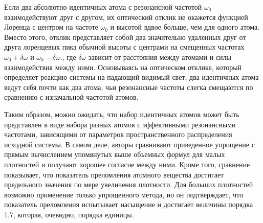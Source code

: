 \documentclass[a4paper, 14pt]{extarticle}
\begin{document}
Если два абсолютно идентичных атома с резонансной частотой $\omega_0$ 
взаимодействуют друг с другом, их оптический отклик не окажется функцией 
Лоренца с центром на частоте $\omega_0$ и высотой вдвое больше, чем для 
одного атома. Вместо этого, отклик представляет собой два значительно 
удаленных друг от друга лоренцевых пика обычной высоты с центрами на 
смещенных частотах $\omega_0 + \delta\omega$ и $\omega_0 
- \delta\omega$., где $\delta\omega$ зависит от расстояния между атомами 
и силы взаимодействия между ними. Основываясь на оптическом отклике, 
который определяет реакцию системы на падающий видимый свет, два 
идентичных атома ведут себя почти как два атома, чьи резонансные частоты 
слегка смещаются по сравнению с изначальной частотой атомов.



Таким образом, можно ожидать, что набор идентичных атомов может быть 
представлен в виде набора разных атомов с эффективными резонансными 
частотами, зависящими от параметров пространственного распределения 
исходной системы. В самом деле, авторы сравнивают приведенное упрощение 
с прямым вычислением упомянутых выше объемных формул для малых 
плотностей и получают хорошее согласие между ними. Кроме того, сравнение 
показывает, что показатель преломления атомного вещества достигает 
предельного значения по мере увеличения плотности. Для больших 
плотностей возможно применение только упрощенного метода, но он 
подтверждает, что показатель преломления испытывает насыщение 
и достигает величины порядка 1.7, которая, очевидно, порядка единицы.

\end{document}
